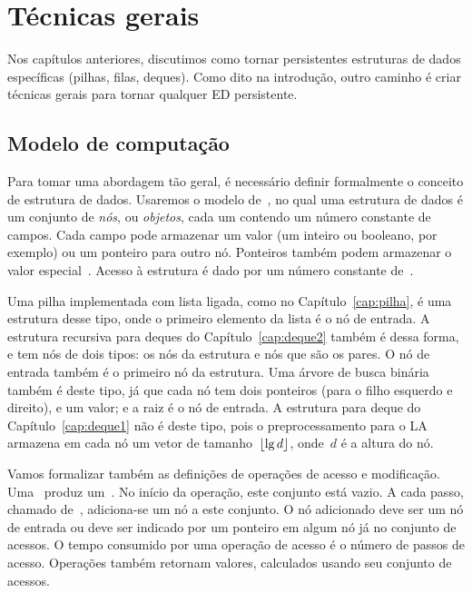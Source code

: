 \documentclass[../../main.tex]{subfiles}
\begin{document}
\chapter{Técnicas gerais} \label{cap:geral}

Nos capítulos anteriores, discutimos como tornar persistentes estruturas de dados específicas (pilhas, filas, deques). Como dito na introdução, outro caminho é criar técnicas gerais para tornar qualquer ED persistente.


\section{Modelo de computação}

Para tomar uma abordagem tão geral, é necessário definir formalmente o conceito de estrutura de dados.  Usaremos o modelo de~, no qual uma estrutura de dados é um conjunto de \emph{nós}, ou \emph{objetos}, cada um contendo um número constante de campos. Cada campo pode armazenar um valor (um inteiro ou booleano, por exemplo) ou um ponteiro para outro nó. Ponteiros também podem armazenar o valor especial~.  Acesso à estrutura é dado por um número constante de~.


Uma pilha implementada com lista ligada, como no Capítulo~\ref{cap:pilha}, é uma estrutura desse tipo, onde o primeiro elemento da lista é o nó de entrada. A estrutura recursiva para deques do Capítulo~\ref{cap:deque2} também é dessa forma, e tem nós de dois tipos: os nós da estrutura e nós que são os pares. O nó de entrada também é o primeiro nó da estrutura.  Uma árvore de busca binária também é deste tipo, já que cada nó tem dois ponteiros (para o filho esquerdo e direito), e um valor; e a raiz é o nó de entrada.  A estrutura para deque do Capítulo~\ref{cap:deque1} não é deste tipo, pois o preprocessamento para o LA armazena em cada nó um vetor de tamanho~$\lfloor\lg d\rfloor$, onde~$d$ é a altura do nó.

Vamos formalizar também as definições de operações de acesso e modificação. Uma~ produz um~. No início da operação, este conjunto está vazio.  A cada passo, chamado de~, adiciona-se um nó a este conjunto. O nó adicionado deve ser um nó de entrada ou deve ser indicado por um ponteiro em algum nó já no conjunto de acessos. O tempo consumido por uma operação de acesso é o número de passos de acesso. Operações também retornam valores, calculados usando seu conjunto de acessos.
\end{document}
